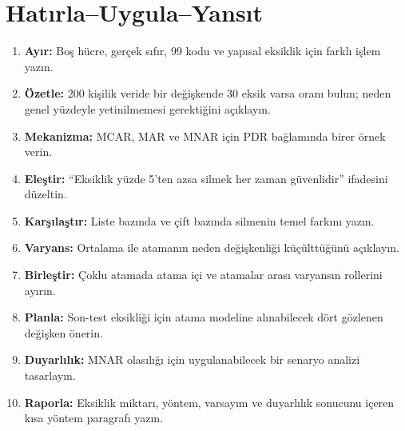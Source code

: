 


\section*{Hatırla--Uygula--Yansıt}

\begin{enumerate}
\renewcommand{\labelenumi}{\textbf{\Alph{enumi}.}}
  \item \textbf{Ayır:} Boş hücre, gerçek sıfır, 99 kodu ve yapısal eksiklik için farklı işlem yazın.
  \item \textbf{Özetle:} 200 kişilik veride bir değişkende 30 eksik varsa oranı bulun; neden genel yüzdeyle yetinilmemesi gerektiğini açıklayın.
  \item \textbf{Mekanizma:} MCAR, MAR ve MNAR için PDR bağlamında birer örnek verin.
  \item \textbf{Eleştir:} ``Eksiklik yüzde 5'ten azsa silmek her zaman güvenlidir'' ifadesini düzeltin.
  \item \textbf{Karşılaştır:} Liste bazında ve çift bazında silmenin temel farkını yazın.
  \item \textbf{Varyans:} Ortalama ile atamanın neden değişkenliği küçülttüğünü açıklayın.
  \item \textbf{Birleştir:} Çoklu atamada atama içi ve atamalar arası varyansın rollerini ayırın.
  \item \textbf{Planla:} Son-test eksikliği için atama modeline alınabilecek dört gözlenen değişken önerin.
  \item \textbf{Duyarlılık:} MNAR olasılığı için uygulanabilecek bir senaryo analizi tasarlayın.
  \item \textbf{Raporla:} Eksiklik miktarı, yöntem, varsayım ve duyarlılık sonucunu içeren kısa yöntem paragrafı yazın.
\end{enumerate}

